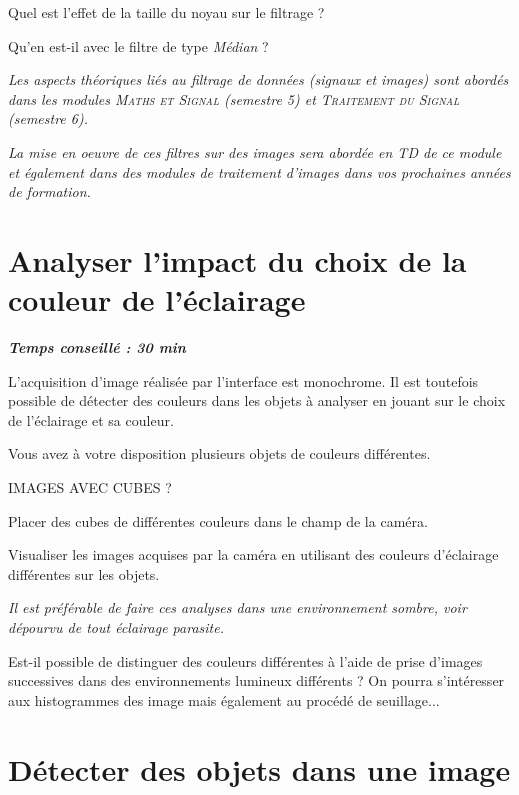 \documentclass[a4paper,11pt,titlepage]{article} %
\begin{document}
\Quest Quel est l'effet de la taille du noyau sur le filtrage ?

\Quest Qu'en est-il avec le filtre de type \textsl{Médian} ? 

\medskip

\textit{Les aspects théoriques liés au filtrage de données (signaux et images) sont abordés dans les modules \textsc{Maths et Signal} (semestre 5) et \textsc{Traitement du Signal} (semestre 6).}

\textit{La mise en oeuvre de ces filtres sur des images sera abordée en TD de ce module et également dans des modules de traitement d'images dans vos prochaines années de formation.}


\newpage
\section{Analyser l'impact du choix de la couleur de l'éclairage}

\begin{center} \textbf{\textit{Temps conseillé : 30 min}} \end{center}

L'acquisition d'image réalisée par l'interface est monochrome. Il est toutefois possible de détecter des couleurs dans les objets à analyser en jouant sur le choix de l'éclairage et sa couleur.

Vous avez à votre disposition plusieurs objets de couleurs différentes.

IMAGES AVEC CUBES ?

\Manip Placer des cubes de différentes couleurs dans le champ de la caméra.

\Manip Visualiser les images acquises par la caméra en utilisant des couleurs d'éclairage différentes sur les objets.

\textit{Il est préférable de faire ces analyses dans une environnement sombre, voir dépourvu de tout éclairage parasite.}

\Quest Est-il possible de distinguer des couleurs différentes à l'aide de prise d'images successives dans des environnements lumineux différents ? On pourra s'intéresser aux histogrammes des image mais également au procédé de seuillage...

\newpage
\section{Détecter des objets dans une image}
\end{document}
